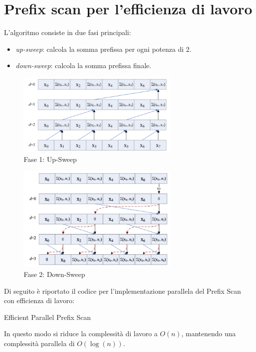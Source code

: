 \section{Prefix scan per l'efficienza di lavoro}
L'algoritmo consiste in due fasi principali:
\begin{itemize}
  \item \textit{up-sweep}: calcola la somma prefissa per ogni potenza di $2$.
  \item \textit{down-sweep}: calcola la somma prefissa finale.
\end{itemize}
\begin{figure}[H]
  \centering
  \includegraphics[width=0.7\textwidth]{img/scan_2_fase1.png}
  \caption{Fase 1: Up-Sweep}
\end{figure}
\begin{figure}[H]
  \centering
  \includegraphics[width=0.7\textwidth]{img/scan_2_fase2.png}
  \caption{Fase 2: Down-Sweep}
\end{figure}

Di seguito è riportato il codice per l'implementazione parallela del Prefix Scan
con efficienza di lavoro:

\begin{algorithm}[H]
\caption{Efficient Parallel Prefix Scan}
\label{alg:efficient_parallel_prefix_scan}
\end{algorithm}

In questo modo si riduce la complessità di lavoro a $O(n)$, mantenendo
una complessità parallela di $O(\log(n))$.
